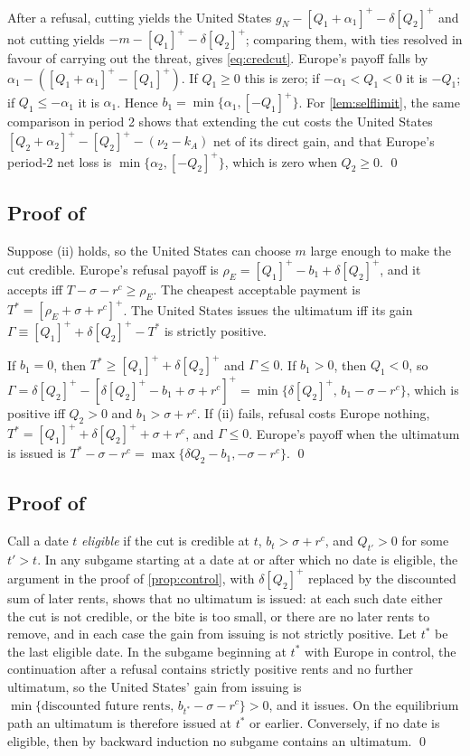 After a refusal, cutting yields the United States $g_N - [Q_1+\alpha_1]^+ - \delta[Q_2]^+$ and not cutting yields $-m - [Q_1]^+ - \delta[Q_2]^+$; comparing them, with ties resolved in favour of carrying out the threat, gives \cref{eq:credcut}. Europe's payoff falls by $\alpha_1 - ([Q_1+\alpha_1]^+ - [Q_1]^+)$. If $Q_1\geq 0$ this is zero; if $-\alpha_1 < Q_1 < 0$ it is $-Q_1$; if $Q_1 \leq -\alpha_1$ it is $\alpha_1$. Hence $b_1 = \min\{\alpha_1, [-Q_1]^+\}$. For \cref{lem:selflimit}, the same comparison in period 2 shows that extending the cut costs the United States $[Q_2+\alpha_2]^+ - [Q_2]^+ - (\nu_2 - k_A)$ net of its direct gain, and that Europe's period-2 net loss is $\min\{\alpha_2,[-Q_2]^+\}$, which is zero when $Q_2\geq 0$. \qed

\subsection*{Proof of }

Suppose (ii) holds, so the United States can choose $m$ large enough to make the cut credible. Europe's refusal payoff is $\rho_E = [Q_1]^+ - b_1 + \delta[Q_2]^+$, and it accepts iff $T - \sigma - r^c \geq \rho_E$. The cheapest acceptable payment is $T^* = [\rho_E + \sigma + r^c]^+$. The United States issues the ultimatum iff its gain $\Gamma \equiv [Q_1]^+ + \delta[Q_2]^+ - T^*$ is strictly positive.

If $b_1 = 0$, then $T^* \geq [Q_1]^+ + \delta[Q_2]^+$ and $\Gamma \leq 0$. If $b_1>0$, then $Q_1<0$, so $\Gamma = \delta[Q_2]^+ - [\delta[Q_2]^+ - b_1 + \sigma + r^c]^+ = \min\{\delta[Q_2]^+,\, b_1 - \sigma - r^c\}$, which is positive iff $Q_2>0$ and $b_1>\sigma + r^c$. If (ii) fails, refusal costs Europe nothing, $T^* = [Q_1]^+ + \delta[Q_2]^+ + \sigma + r^c$, and $\Gamma \leq 0$. Europe's payoff when the ultimatum is issued is $T^* - \sigma - r^c = \max\{\delta Q_2 - b_1, -\sigma - r^c\}$. \qed

\subsection*{Proof of }

Call a date $t$ \emph{eligible} if the cut is credible at $t$, $b_t > \sigma + r^c$, and $Q_{t'}>0$ for some $t'>t$. In any subgame starting at a date at or after which no date is eligible, the argument in the proof of \cref{prop:control}, with $\delta[Q_2]^+$ replaced by the discounted sum of later rents, shows that no ultimatum is issued: at each such date either the cut is not credible, or the bite is too small, or there are no later rents to remove, and in each case the gain from issuing is not strictly positive. Let $t^*$ be the last eligible date. In the subgame beginning at $t^*$ with Europe in control, the continuation after a refusal contains strictly positive rents and no further ultimatum, so the United States' gain from issuing is $\min\{\text{discounted future rents},\, b_{t^*} - \sigma - r^c\} > 0$, and it issues. On the equilibrium path an ultimatum is therefore issued at $t^*$ or earlier. Conversely, if no date is eligible, then by backward induction no subgame contains an ultimatum. \qed

